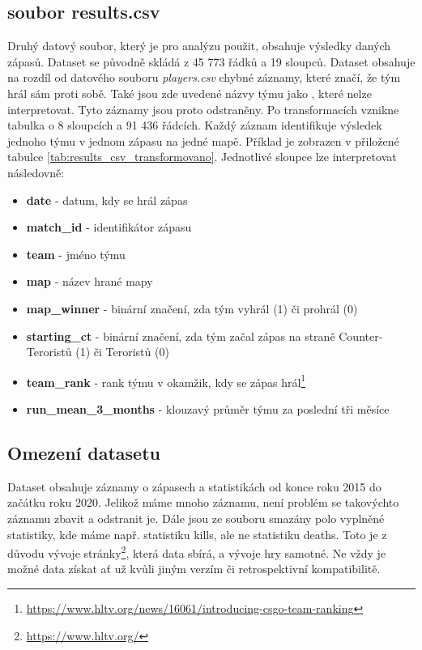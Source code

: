 \subsection{soubor results.csv}
Druhý datový soubor, který je pro analýzu použit, obsahuje výsledky daných zápasů. Dataset se původně skládá z 45 773 řádků a 19 sloupců. Dataset obsahuje na rozdíl
od datového souboru \textit{players.csv} chybné záznamy, které značí, že tým hrál sám proti sobě. Také jsou zde uvedené názvy týmu jako , které nelze interpretovat.
Tyto záznamy jsou proto odstraněny. Po transformacích vznikne tabulka o 8 sloupcích a 91 436 řádcích. Každý záznam identifikuje výsledek jednoho týmu v jednom zápasu
na jedné mapě. Příklad je zobrazen v přiložené tabulce \ref{tab:results_csv_transformovano}. Jednotlivé sloupce lze interpretovat následovně:
\begin{itemize}
    \item \textbf{date} - datum, kdy se hrál zápas
    \item \textbf{match\_id} - identifikátor zápasu
    \item \textbf{team} - jméno týmu
    \item \textbf{map} - název hrané mapy
    \item \textbf{map\_winner} - binární značení, zda tým vyhrál (1) či prohrál (0)
    \item \textbf{starting\_ct} - binární značení, zda tým začal zápas na straně Counter-Teroristů (1) či Teroristů (0)
    \item \textbf{team\_rank} - rank týmu v okamžik, kdy se zápas hrál\footnote{\url{https://www.hltv.org/news/16061/introducing-csgo-team-ranking}}
    \item \textbf{run\_mean\_3\_months} - klouzavý průměr týmu za poslední tři měsíce
\end{itemize}

\subsection{Omezení datasetu}
Dataset obsahuje záznamy o zápasech a statistikách od konce roku 2015 do začátku roku 2020. Jelikož máme mnoho záznamu, není problém se takovýchto
záznamu zbavit a odstranit je. Dále jsou ze souboru smazány polo vyplněné statistiky, kde máme např. statistiku kills, ale ne statistiku deaths. Toto je z důvodu
vývoje stránky\footnote{\url{https://www.hltv.org/}}, která data sbírá, a vývoje hry samotné. Ne vždy je možné data získat ať už kvůli jiným verzím či retrospektivní
kompatibilitě.

